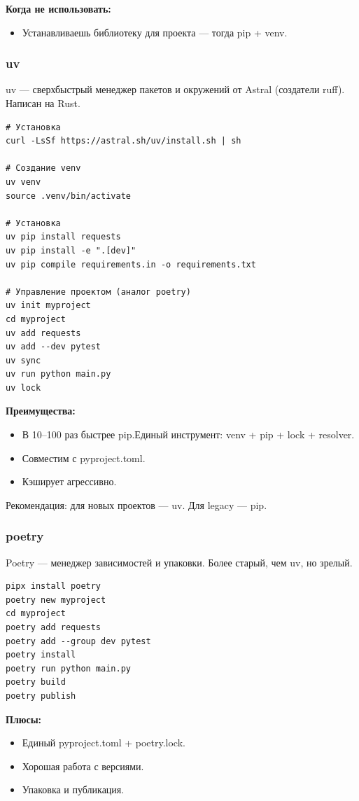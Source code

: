 \textbf {Когда не использовать:}
\begin{itemize}
\item Устанавливаешь библиотеку для проекта — тогда pip + venv.
\end{itemize}

\subsubsection{uv}
uv — сверхбыстрый менеджер пакетов и окружений от Astral (создатели ruff). Написан на Rust.
\begin{lstlisting}
# Установка
curl -LsSf https://astral.sh/uv/install.sh | sh

# Создание venv
uv venv
source .venv/bin/activate

# Установка
uv pip install requests
uv pip install -e ".[dev]"
uv pip compile requirements.in -o requirements.txt

# Управление проектом (аналог poetry)
uv init myproject
cd myproject
uv add requests
uv add --dev pytest
uv sync
uv run python main.py
uv lock
\end{lstlisting}

\textbf{Преимущества:}
\begin{itemize}
\item В 10–100 раз быстрее pip.Единый инструмент: venv + pip + lock + resolver.
\item Совместим с pyproject.toml.
\item Кэширует агрессивно.
\end{itemize}
\begin{warningbox2}
Рекомендация: для новых проектов — uv. Для legacy — pip.
\end{warningbox2}

\subsubsection{poetry}
Poetry — менеджер зависимостей и упаковки. Более старый, чем uv, но зрелый.
\begin{lstlisting}
pipx install poetry
poetry new myproject
cd myproject
poetry add requests
poetry add --group dev pytest
poetry install
poetry run python main.py
poetry build
poetry publish
\end{lstlisting}

\textbf{Плюсы:}
\begin{itemize}
\item Единый pyproject.toml + poetry.lock.
\item Хорошая работа с версиями.
\item Упаковка и публикация.
\end{itemize}

